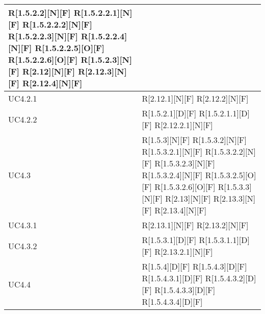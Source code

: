 \begin{longtable}{X | X}
R[1.5.2.2][N][F] \newline
R[1.5.2.2.1][N][F] \newline
R[1.5.2.2.2][N][F] \newline
R[1.5.2.2.3][N][F] \newline
R[1.5.2.2.4][N][F] \newline
R[1.5.2.2.5][O][F] \newline
R[1.5.2.2.6][O][F] \newline
R[1.5.2.3][N][F] \newline
R[2.12][N][F] \newline
R[2.12.3][N][F] \newline
R[2.12.4][N][F]  \\
\hline
UC4.2.1 & R[2.12.1][N][F] \newline
R[2.12.2][N][F]  \\
\hline
UC4.2.2 & R[1.5.2.1][D][F] \newline
R[1.5.2.1.1][D][F] \newline
R[2.12.2.1][N][F]  \\
\hline
UC4.3 & R[1.5.3][N][F] \newline
R[1.5.3.2][N][F] \newline
R[1.5.3.2.1][N][F] \newline
R[1.5.3.2.2][N][F] \newline
R[1.5.3.2.3][N][F] \newline
R[1.5.3.2.4][N][F] \newline
R[1.5.3.2.5][O][F] \newline
R[1.5.3.2.6][O][F] \newline
R[1.5.3.3][N][F] \newline
R[2.13][N][F] \newline
R[2.13.3][N][F] \newline
R[2.13.4][N][F]  \\
\hline
UC4.3.1 & R[2.13.1][N][F] \newline
R[2.13.2][N][F]  \\
\hline
UC4.3.2 & R[1.5.3.1][D][F] \newline
R[1.5.3.1.1][D][F] \newline
R[2.13.2.1][N][F]  \\
\hline
UC4.4 & R[1.5.4][D][F] \newline
R[1.5.4.3][D][F] \newline
R[1.5.4.3.1][D][F] \newline
R[1.5.4.3.2][D][F] \newline
R[1.5.4.3.3][D][F] \newline
R[1.5.4.3.4][D][F] \newline

\end{longtable}
